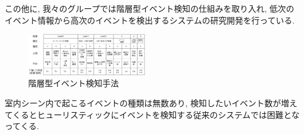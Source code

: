 この他に, 我々のグループでは階層型イベント検知の仕組みを取り入れ, 低次のイベント情報から高次のイベントを検出するシステムの研究開発を行っている. 
\begin{figure}[h!]
	\centering
	\includegraphics[width=0.47\textwidth,clip]{img/hierarchicalDetection.eps}
	\caption{階層型イベント検知手法}
	\label{fig:hierarchical_event_detecion}
\end{figure}

室内シーン内で起こるイベントの種類は無数あり, 検知したいイベント数が増えてくるとヒューリスティックにイベントを検知する従来のシステムでは困難となってくる. 
